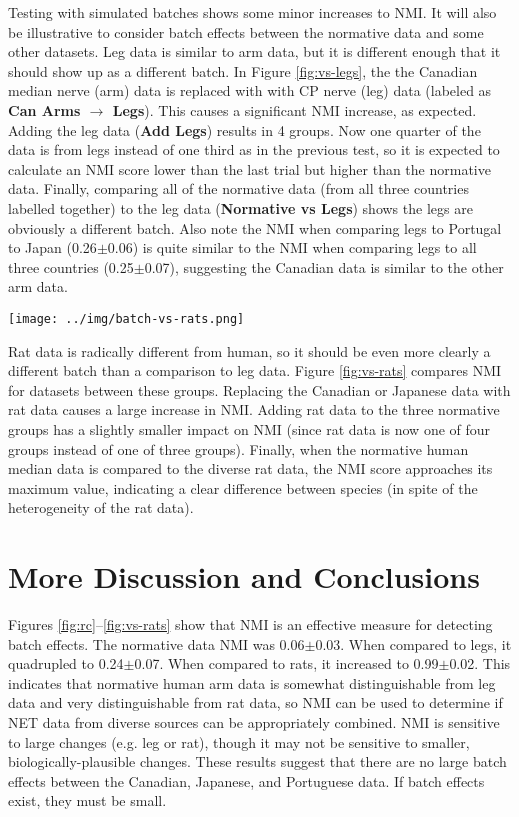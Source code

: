 \documentclass[12pt]{article}
\begin{document}
Testing with simulated batches shows some minor increases to NMI. It will also be illustrative to consider batch effects between the normative data and some other datasets. Leg data is similar to arm data, but it is different enough that it should show up as a different batch. In Figure \ref{fig:vs-legs}, the the Canadian median nerve (arm) data is replaced with with CP nerve (leg) data (labeled as \textbf{Can Arms $\rightarrow$ Legs}). This causes a significant NMI increase, as expected. Adding the leg data (\textbf{Add Legs}) results in 4 groups. Now one quarter of the data is from legs instead of one third as in the previous test, so it is expected to calculate an NMI score lower than the last trial but higher than the normative data. Finally, comparing all of the normative data (from all three countries labelled together) to the leg data (\textbf{Normative vs Legs}) shows the legs are obviously a different batch. Also note the NMI when comparing legs to Portugal to Japan (0.26$\pm$0.06) is quite similar to the NMI when comparing legs to all three countries  (0.25$\pm$0.07), suggesting the Canadian data is similar to the other arm data.

\pagebreak

\begin{figure*}
  \centering
       \texttt{[image: ../img/batch-vs-rats.png]}
         \caption{}
  \label{fig:vs-rats}
\end{figure*}

Rat data is radically different from human, so it should be even more clearly a different batch than a comparison to leg data.  Figure \ref{fig:vs-rats} compares NMI for datasets between these groups. Replacing the Canadian or Japanese data with rat data causes a large increase in NMI. Adding rat data to the three normative groups has a slightly smaller impact on NMI (since rat data is now one of four groups instead of one of three groups). Finally, when the normative human median data is compared to the diverse rat data, the NMI score approaches its maximum value, indicating a clear difference between species (in spite of the heterogeneity of the rat data).

\pagebreak

\section*{More Discussion and Conclusions}

Figures \ref{fig:rc}–\ref{fig:vs-rats} show that NMI is an effective measure for detecting batch effects. The normative data NMI was 0.06$\pm$0.03. When compared to legs, it quadrupled to 0.24$\pm$0.07. When compared to rats, it increased to 0.99$\pm$0.02. This indicates that normative human arm data is somewhat distinguishable from leg data and very distinguishable from rat data, so NMI can be used to determine if NET data from diverse sources can be appropriately combined. NMI is sensitive to large changes (e.g. leg or rat), though it may not be sensitive to smaller, biologically-plausible changes. These results suggest that there are no large batch effects between the Canadian, Japanese, and Portuguese data. If batch effects exist, they must be small.
\end{document}
